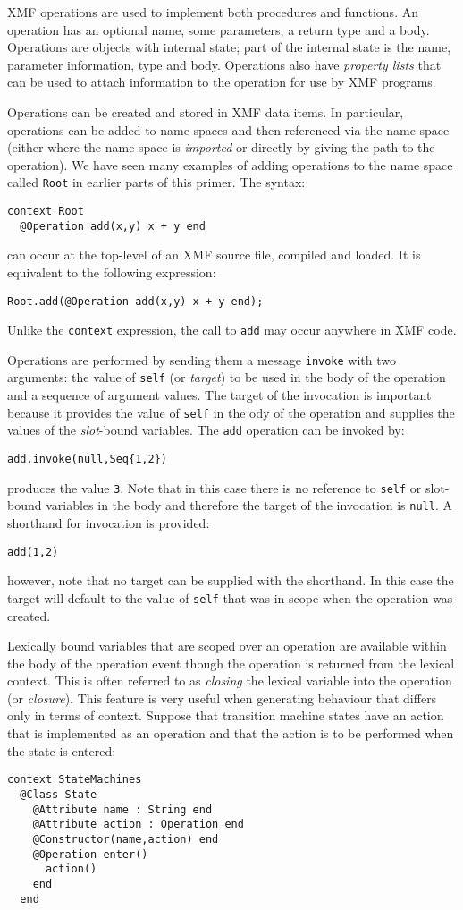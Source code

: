 \documentclass{article}
\begin{document}
XMF operations are used to implement both procedures and functions. An operation has an optional
name, some parameters, a return type and a body. Operations are objects with internal state;
part of the internal state is the name, parameter information, type and body. Operations
also have {\it property lists} that can be used to attach information to the operation for
use by XMF programs.

Operations can be created and stored in XMF data items. In particular, operations can be added
to name spaces and then referenced via the name space (either where the name space is {\it imported}
or directly by giving the path to the operation). We have seen many examples of adding
operations to the name space called {\tt Root} in earlier parts of this primer. The syntax:
\begin{verbatim}
context Root
  @Operation add(x,y) x + y end
\end{verbatim}
can occur at the top-level of an XMF source file, compiled and loaded. It is equivalent to the
following expression:
\begin{verbatim}
Root.add(@Operation add(x,y) x + y end);
\end{verbatim}
Unlike the {\tt context} expression, the call to {\tt add} may occur anywhere in XMF code.

Operations are performed by sending them a message {\tt invoke} with two arguments: the
value of {\tt self} (or {\it target}) to be used in the body of the operation and a sequence of 
argument values. The target of the invocation is important because it provides the value 
of {\tt self} in the ody of the operation and supplies the values of the {\it slot}-bound
variables. The {\tt add} operation can be invoked by:
\begin{verbatim}
add.invoke(null,Seq{1,2})
\end{verbatim}
produces the value {\tt 3}. Note that in this case there is no reference to {\tt self}
or slot-bound variables in the body and therefore the target of the invocation is {\tt null}.
A shorthand for invocation is provided:
\begin{verbatim}
add(1,2)
\end{verbatim}
however, note that no target can be supplied with the shorthand. In this case the target will
default to the value of {\tt self} that was in scope when the operation was created.

Lexically bound variables that are scoped over an operation are available within the body
of the operation event though the operation is returned from the lexical context. This is
often referred to as {\it closing} the lexical variable into the operation (or {\it closure}).
This feature is very useful when generating behaviour that differs only in terms of
context. Suppose that transition machine states have an action that is implemented as an
operation and that the action is to be performed when the state is entered:
\begin{verbatim}
context StateMachines
  @Class State
    @Attribute name : String end
    @Attribute action : Operation end
    @Constructor(name,action) end
    @Operation enter()
      action()
    end
  end
\end{verbatim}
\end{document}
